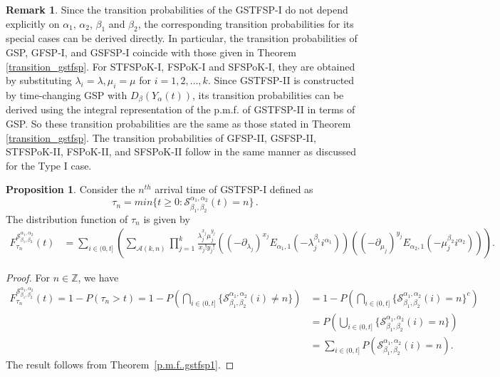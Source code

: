 \documentclass[11pt,oneside,reqno]{amsart}
\theoremstyle{definition}
\newtheorem{remark}{\bf Remark}[section]
\newtheorem{proposition}{Proposition}[section]
\theoremstyle{remarkstyle}
\begin{document}
\begin{remark}
    Since the transition probabilities of the GSTFSP-I do not depend explicitly on $\alpha_1$, $\alpha_2$, $\beta_1$ and $\beta_2$, the corresponding transition probabilities for its special cases can be derived directly. In particular, the transition probabilities of GSP, GFSP-I, and GSFSP-I coincide with those given in Theorem \ref{transition_gstfsp}. For STFSPoK-I, FSPoK-I and SFSPoK-I, they are obtained by substituting  $\lambda_i=\lambda, \mu_i=\mu$ for $i=1,2,\dots,k$. Since GSTFSP-II is constructed by time-changing GSP with $D_\beta(Y_\alpha(t))$, its transition probabilities can be derived using the integral representation of the p.m.f. of GSTFSP-II in terms of GSP. So these transition probabilities are the same as those stated in Theorem \ref{transition_gstfsp}. The transition probabilities of GFSP-II, GSFSP-II, STFSPoK-II, FSPoK-II, and SFSPoK-II follow in the same manner as discussed for the Type I case.
\end{remark}

\begin{proposition}\label{arrival.gstfsp}
Consider the $n^{th} $ arrival time of GSTFSP-I defined as 
\begin{equation*}
\tau_n=min\{t\geq 0: \mathcal{S}_{\beta_1,\beta_2}^{\alpha_1,\alpha_2}(t)=n\}\,.
\end{equation*}
The distribution function of $\tau_n$ is given by 
\begin{align*}
    F^{\mathcal{S}_{\beta_1,\beta_2}^{\alpha_1,\alpha_2}}_{\tau_n}(t)&=\sum_{i\in(0,t]}(\sum_{\mathcal{A}(k,n)}\prod_{j=1}^{k}\frac{\lambda_j^{x_j}\mu_j^{y_j}}{x_j!y_j!}((-\partial_{\lambda_j})^{x_j}E_{\alpha_1,1}(-\lambda_j^{\beta_1} i^{\alpha_1}))((-\partial_{\mu_j})^{y_j}E_{\alpha_2,1}(-\mu_j^{\beta_2} i^{\alpha_2}))).
\end{align*}  
\end{proposition}
\begin{proof}
For $n\in \mathbb{Z}$, we have
\begin{align*}
F^{\mathcal{S}_{\beta_1,\beta_2}^{\alpha_1,\alpha_2}}_{\tau_n}(t)=1-P(\tau_n > t)=1-P(\bigcap_{i\in (0,t]}\{\mathcal{S}_{\beta_1,\beta_2}^{\alpha_1,\alpha_2}(i)\neq n\})&=1-P(\bigcap_{i\in (0,t]}\{\mathcal{S}_{\beta_1,\beta_2}^{\alpha_1,\alpha_2}(i)= n\}^c)\\
        &=P(\bigcup_{i\in (0,t]}\{\mathcal{S}_{\beta_1,\beta_2}^{\alpha_1,\alpha_2}(i)= n\})\\
        &= \sum_{i\in(0,t]}P(\mathcal{S}_{\beta_1,\beta_2}^{\alpha_1,\alpha_2}(i)= n).
\end{align*}
The result follows from Theorem~\ref{p.m.f..gstfsp1}. 
\end{proof}
 
\end{document}
